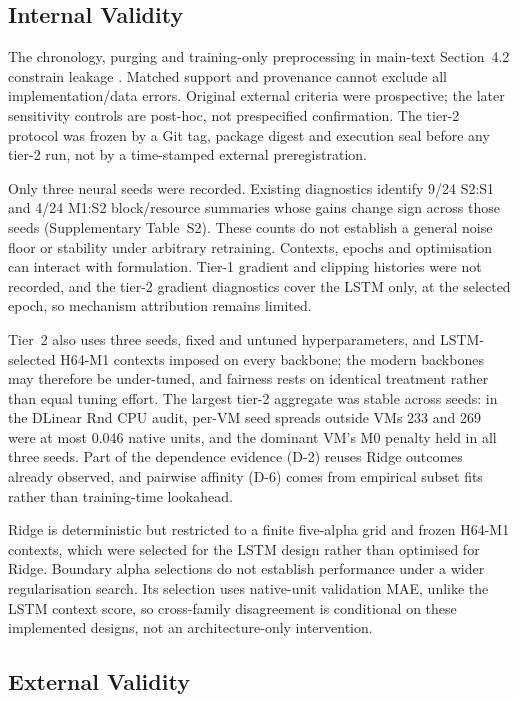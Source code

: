 \documentclass[a4paper,11pt]{article}
\begin{document}
\subsection*{Internal Validity}


The chronology, purging and training-only preprocessing in
main-text Section~4.2 constrain leakage
\citep{Cerqueira2020Evaluation,Hyndman2021Forecasting}.
Matched support and provenance cannot exclude all implementation/data errors.
Original external criteria were prospective; the later sensitivity controls
are post-hoc, not prespecified confirmation. The tier-2 protocol was frozen
by a Git tag, package digest and execution seal before any tier-2 run, not
by a time-stamped external preregistration.

Only three neural seeds were recorded. Existing diagnostics identify 9/24
S2:S1 and 4/24 M1:S2 block/resource summaries whose gains change sign across
those seeds (Supplementary Table~S2). These counts do not establish a general noise floor or stability
under arbitrary retraining. Contexts, epochs and optimisation can interact
with formulation. Tier-1 gradient and clipping histories were not recorded,
and the tier-2 gradient diagnostics cover the LSTM only, at the selected
epoch, so mechanism attribution remains limited.

Tier~2 also uses three seeds, fixed and untuned hyperparameters, and
LSTM-selected H64-M1 contexts imposed on every backbone; the modern
backbones may therefore be under-tuned, and fairness rests on identical
treatment rather than equal tuning effort. The largest tier-2 aggregate was
stable across seeds: in the DLinear Rnd CPU audit, per-VM seed spreads
outside VMs 233 and 269 were at most 0.046 native units, and the
dominant VM's M0 penalty held in all three seeds. Part of the dependence
evidence (D-2) reuses Ridge outcomes already observed, and pairwise affinity
(D-6) comes from empirical subset fits rather than training-time lookahead.

Ridge is deterministic but restricted to a finite five-alpha grid and frozen
H64-M1 contexts, which were selected for the LSTM design rather than optimised
for Ridge. Boundary alpha selections do not establish performance under a
wider regularisation search. Its selection uses native-unit validation MAE,
unlike the LSTM context score, so cross-family disagreement is conditional on
these implemented designs, not an architecture-only intervention.

\subsection*{External Validity}
\end{document}
